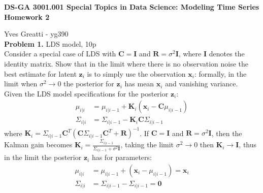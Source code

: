 \documentclass[12pt]{article}
\newcommand{\matr}[1]{\bm{#1}}     %
\newcommand{\vect}[1]{\mathbf{#1}}
\begin{document}
\thispagestyle{empty}
\begin{center}

\textbf{DS-GA 3001.001 Special Topics in Data Science: Modeling Time Series\\
Homework 2}
\end{center}

\noindent Yves Greatti - yg390\\

\noindent \textbf{Problem 1.} LDS model, 10p \\ %
Consider a special case of LDS with $\vect{C} = \vect{I}$ and  $\vect{R} = \sigma^2 \vect{I}$, where $\vect{I}$ denotes the identity matrix. 
Show that in the limit where there is no observation noise the best estimate for latent $\vect{z}_i$ is to simply use the observation $\vect{x}_i$: 
formally, in the limit when $\sigma^2 \rightarrow 0$ the posterior for $\vect{z}_i$ has mean $\vect{x}_i$ and vanishing variance.\\
Given the LDS model specifications for the posterior $\vect{z}_i$:
\begin{align*}
	\mu_{i|i}		&= 	\mu_{i|i-1} + \matr{K}_i (\vect{x}_i - \matr{C} \mu_{i|i-1}) \\
	\Sigma_{i|i}	&=	\Sigma_{i|i-1} - \matr{K}_i 	 \matr{C}  \Sigma_{i|i-1}
\end{align*}
where $ \matr{K}_i = \Sigma_{i|i-1}	 \matr{C} ^T ( \matr{C} \Sigma_{i|i-1}  \matr{C} ^T + \matr{R})^{-1}$. If $\vect{C} = \vect{I}$ and  $\vect{R} = \sigma^2 \vect{I}$, then the Kalman gain becomes
 $ \matr{K}_i = \frac{\Sigma_{i|i-1}} {\Sigma_{i|i-1} + \sigma^2 \vect{I}} $, taking the limit  $\sigma^2 \rightarrow 0$ then $ \matr{K}_i \rightarrow \vect{I}$, thus in the limit the posterior $\vect{z}_i$ has for parameters:
\begin{align*}
	\mu_{i|i}		&= 	\mu_{i|i-1} + (\vect{x}_i - \mu_{i|i-1})  = \vect{x}_i \\
	\Sigma_{i|i}	&=	\Sigma_{i|i-1} -  \Sigma_{i|i-1} = \vect{0}
\end{align*}
\end{document}
